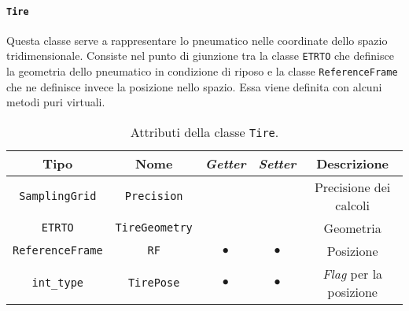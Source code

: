 \paragraph{\texttt{Tire}}
Questa classe serve a rappresentare lo pneumatico nelle coordinate dello spazio tridimensionale. Consiste nel punto di giunzione tra la classe \texttt{ETRTO} che definisce la geometria dello pneumatico in condizione di riposo e la classe \texttt{ReferenceFrame} che ne definisce invece la posizione nello spazio. Essa viene definita con alcuni metodi puri virtuali.
\begin{table}[h!]
	\centering
	\begin{tabular}{|c|c|c|c|c|}
		\hline 
		\textbf{Tipo} & \textbf{Nome} & \textit{\textbf{Getter}} & \textit{\textbf{Setter}} & \textbf{Descrizione} \\ \hline 
		\texttt{SamplingGrid} & \texttt{Precision} & & & Precisione dei calcoli \\ \hline 
		\texttt{ETRTO} & \texttt{TireGeometry} & & & Geometria \\ \hline 
		\texttt{ReferenceFrame} & \texttt{RF} & $\bullet$ & $\bullet$ & Posizione \\ \hline
		\texttt{int\_type} & \texttt{TirePose} & $\bullet$ & $\bullet$ & \textit{Flag} per la posizione \\ \hline
	\end{tabular}
	\caption{Attributi della classe \texttt{Tire}.}
	\label{}
\end{table}
%
